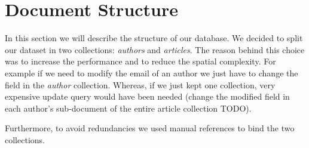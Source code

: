 \documentclass{Configuration_Files/PoliMi3i_thesis}
\begin{document}
\chapter{Document Structure}
\label{ch:document_structure}
In this section we will describe the structure of our database. We decided to split our dataset in two collections:
\emph{authors} and \emph{articles}. The reason behind this choice was to increase the performance and to reduce the
spatial complexity. For example if we need to modify the email of an author we just have to change the field in the
\emph{author} collection. Whereas, if we just kept one collection, very expensive update query would have been needed
(change the modified field in each author's sub-document of the entire article collection TODO).

Furthermore, to avoid redundancies we used manual references to bind the two collections.
\end{document}
